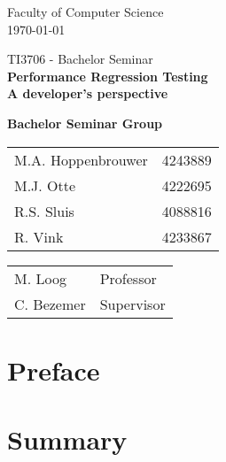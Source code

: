 \documentclass[oneside]{book}
\begin{document}
\frontmatter

\begin{titlepage}

\begin{center}
\begin{figure}[h!]
\centering
\end{figure}
Faculty of Computer Science \\
\today

\vspace{3.5cm}
\selectfont
{\Large TI3706 - Bachelor Seminar}\\
\vspace{0.0cm}
\Huge{\textbf{Performance Regression Testing\\ A developer's perspective}}
\vspace{0.5cm}
\selectfont

\vspace{5cm}
\normalsize{\textbf{Bachelor Seminar Group}}

\begin{tabular}{ l r}
\normalsize{M.A. Hoppenbrouwer} & \normalsize{4243889} \\
\normalsize{M.J. Otte} & \normalsize{4222695} \\
\normalsize{R.S. Sluis} & \normalsize{4088816} \\
\normalsize{R. Vink} & \normalsize{4233867}\\
\end{tabular}

\vspace{0.75cm}

\begin{tabular}{ l l }
\normalsize{M. Loog} & \normalsize{Professor} \\
\normalsize{C. Bezemer} & \normalsize{Supervisor} \\
\end{tabular}

\end{center}
\end{titlepage}

\chapter{Preface}


\chapter{Summary}
% 
\end{document}

